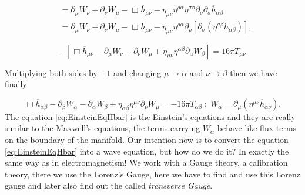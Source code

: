 \begin{align*}
            &= \partial_{\mu}W_{\nu} + \partial_{\nu}W_{\mu} - \Box\overline{h}_{\mu\nu} - \eta_{\mu\nu}\eta^{\rho\alpha}\eta^{\sigma\beta}\partial_{\rho}\partial_{\sigma}\overline{h}_{\alpha\beta}\\
            &= \partial_{\mu}W_{\nu} + \partial_{\nu}W_{\mu} - \Box\overline{h}_{\mu\nu} - \eta_{\mu\nu}\eta^{\rho\alpha}\partial_{\rho}\left[\partial_{\sigma} \left(\eta^{\sigma\beta}\overline{h}_{\alpha\beta} \right) \right],
        \end{align*}

        \begin{equation}
            -\left[\Box\overline{h}_{\mu\nu} - \partial_{\mu}W_{\nu}-\partial_{\nu}W_{\mu} + \eta_{\mu\nu}\eta^{\alpha\beta}\partial_{\alpha}W_{\beta} \right] = 16\pi T_{\mu\nu}
        \end{equation}

Multiplying both sides by $-1$ and changing $\mu \rightarrow \alpha$ and $\nu \rightarrow \beta$ then we have finally

        \begin{equation}\label{eq:EinsteinEqHbar}
            \Box \overline{h}_{\alpha\beta} - \partial_{\beta}W_{\alpha} - \partial_{\alpha}W_{\beta} + \eta_{\alpha\beta}\eta^{\mu\nu}\partial_{\nu}W_{\mu} = -16\pi T_{\alpha\beta}\;;\;W_{\alpha}= \partial_{\mu}\left(\eta^{\mu\nu}\overline{h}_{\alpha\nu} \right).
        \end{equation}
        The equation \ref{eq:EinsteinEqHbar} is the Einstein's equations and they are really similar to the Maxwell's equations, the terms carrying $W_{\alpha}$ behave like flux terms on the boundary of the manifold. Our intention now is to convert the equation \ref{eq:EinsteinEqHbar} into a wave equation, but how do we do it? In exactly the same way as in electromagnetism! We work with a Gauge theory, a calibration theory, there we use the Lorenz's Gauge, here we have to find and use this Lorenz gauge and later also find out the called \textit{transverse Gauge}.
